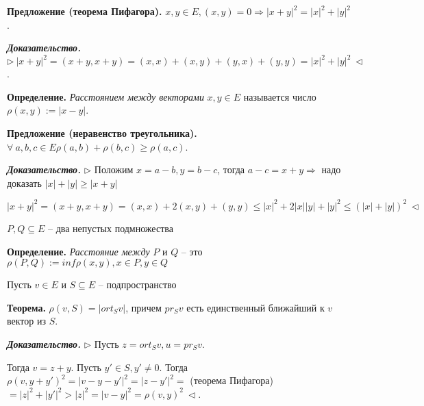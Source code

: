 \bigskip
\textbf{Предложение (теорема Пифагора).} $x, y \in E, (x, y) = 0 \Rightarrow |x+y|^2 = |x|^2 + |y|^2$.

\bigskip
\textbf{\textit{Доказательство.}} $\rhd \ |x+y|^2 = (x+y, x+y) = (x,x) + (x,y) + (y,x) + (y,y) = |x|^2 + |y|^2 \ \lhd$.

\bigskip
\textbf{Определение.} \textit{Расстоянием между векторами} $x, y \in E$ называется число $\rho (x, y) := |x - y|$. 

\bigskip
\textbf{Предложение (неравенство треугольника).} $\forall \ a, b, c \in E \rho(a, b) + \rho(b, c) \geq \rho(a, c)$.

\bigskip
\textbf{\textit{Доказательство.}} $\rhd$ Положим $x = a - b, y = b - c$, тогда $a - c = x + y \Rightarrow$  надо доказать $|x| + |y| \geq |x + y|$

$|x + y|^2 = (x+y, x+y) = (x,x) + 2(x,y) + (y,y) \leq |x|^2 + 2 |x| |y| + |y|^2 \leq (|x| + |y|)^2 \ \lhd$

\bigskip
$P, Q \subseteq E$ -- два непустых подмножества

\textbf{Определение.} \textit{Расстояние между} $P$ и $Q$ -- это $\rho(P, Q) := inf \rho (x, y), x \in P, y \in Q$

\bigskip
Пусть $v \in E$ и $S \subseteq E$ -- подпространство

\textbf{Теорема.} $\rho (v, S) = |ort_S v|$, причем $pr_S v$ есть единственный ближайший к $v$ вектор из $S$. 

\bigskip
\textbf{\textit{Доказательство.}} $\rhd$ Пусть $z = ort_S v, u = pr_S v$.

Тогда $v = z + y$. Пусть $y' \in S, y' \neq 0$. Тогда $\rho (v, y + y')^2 = |v - y - y'|^2 = |z - y'|^2 =$ (теорема Пифагора) $= |z|^2 + |y'|^2 > |z|^2 = |v - y|^2 = \rho (v, y)^2 \ \lhd$.

